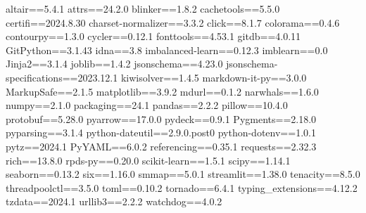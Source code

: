 altair==5.4.1
attrs==24.2.0
blinker==1.8.2
cachetools==5.5.0
certifi==2024.8.30
charset-normalizer==3.3.2
click==8.1.7
colorama==0.4.6
contourpy==1.3.0
cycler==0.12.1
fonttools==4.53.1
gitdb==4.0.11
GitPython==3.1.43
idna==3.8
imbalanced-learn==0.12.3
imblearn==0.0
Jinja2==3.1.4
joblib==1.4.2
jsonschema==4.23.0
jsonschema-specifications==2023.12.1
kiwisolver==1.4.5
markdown-it-py==3.0.0
MarkupSafe==2.1.5
matplotlib==3.9.2
mdurl==0.1.2
narwhals==1.6.0
numpy==2.1.0
packaging==24.1
pandas==2.2.2
pillow==10.4.0
protobuf==5.28.0
pyarrow==17.0.0
pydeck==0.9.1
Pygments==2.18.0
pyparsing==3.1.4
python-dateutil==2.9.0.post0
python-dotenv==1.0.1
pytz==2024.1
PyYAML==6.0.2
referencing==0.35.1
requests==2.32.3
rich==13.8.0
rpds-py==0.20.0
scikit-learn==1.5.1
scipy==1.14.1
seaborn==0.13.2
six==1.16.0
smmap==5.0.1
streamlit==1.38.0
tenacity==8.5.0
threadpoolctl==3.5.0
toml==0.10.2
tornado==6.4.1
typing_extensions==4.12.2
tzdata==2024.1
urllib3==2.2.2
watchdog==4.0.2